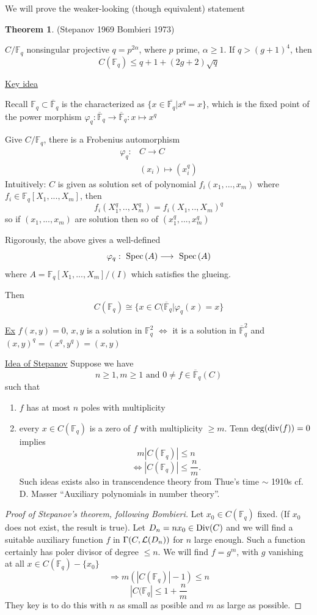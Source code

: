 \documentclass[11pt]{article}
\theoremstyle{definition}
\newtheorem{thm}{Theorem}[section]
\newcommand{\spec}{\text{ Spec}\,}
\newcommand{\bbf}{\mathbb F}
\newcommand{\call}{{\cal L}}
\renewcommand{\div}{\textnormal{div}}
\newcommand{\Div}{\textnormal{Div}}
\newcommand{\Lrta}{\Longrightarrow}
\newcommand{\lrta}{\longrightarrow}
\newcommand{\Llrta}{\Longleftrightarrow}
\begin{document}
We will prove the weaker-looking (though equivalent) statement 
\begin{thm}
(Stepanov 1969 Bombieri 1973)

$C/\bbf_q$ nonsingular projective $q=p^{2\alpha}$, where $p$ prime, $\alpha\geq 1$. If $q> (g+1)^4$, then 
$$
C(\bbf_q)\leq q+1+(2g+2)\sqrt{q}
$$
\end{thm}

\underline{Key idea}

Recall $\bbf_q\subset \overline{\bbf}_q$ is the characterized as $\{x\in \overline{\bbf_q}|x^q=x\}$, which is the fixed point of the power morphism $\varphi_q:\overline{\bbf}_q\lrta\overline{\bbf}_q:x\longmapsto x^q$

Give $C/\bbf_q$, there is a Frobenius automorphism
$$
\begin{aligned}
\varphi_q:&C\lrta C\\
& (x_i)\longmapsto (x_i^q)
\end{aligned}
$$
Intuitively: $C$ is given as solution set of polynomial $f_i(x_1,...,x_m)$ where $f_i\in\bbf_q[X_1,...,X_m]$, then
$$
f_i(X_1^q,..,X_m^q)=f_i(X_1,..,X_m)^q
$$
so if $(x_1,...,x_m)$ are solution then so of $(x_1^q,...,x_m^q)$


Rigorously, the above gives a well-defined 
$$
\varphi_q:\spec(A)\lrta \spec (A)\\
$$
where $A=\bbf_q[X_1,...,X_m]/(I)$ which satisfies the glueing.

Then
$$
C(\bbf_q)\cong \{x\in C(\overline{\bbf}_q|\varphi_q(x)=x\}
$$

\underline{Ex}
$f(x,y)=0$, $x,y$ is a solution in $\bbf_q^2$ $\Llrta $ it is a solution in $\overline{\bbf}_q^2$ and $(x,y)^q=(x^q,y^q)=(x,y)$

\underline{Idea of Stepanov}
Suppose we have 
$$
n\geq 1, m\geq 1 \text{ and } 0\neq f\in \overline{\bbf}_q(C)
$$
such that 
\begin{enumerate}
\item $f$ has at most $n$ poles with multiplicity
\item every $x\in C(\bbf_q)$ is a zero of $f$ with multiplicity $\geq m$. Tenn $\deg(\div(f))=0$ implies 
$$
m|C(\bbf_q)|\leq n
$$
$$
\Llrta |C(\bbf_q)|\leq \frac{n}{m}.
$$
Such ideas exists also in transcendence theory from Thue's time $\sim$ 1910s cf. D. Masser ``Auxiliary polynomials in number theory''.
\end{enumerate}
\begin{proof}[Proof of Stepanov's theorem, following Bombieri]
Let $x_0\in C(\bbf_q)$ fixed. (If $x_0$ does not exist, the result is true).
Let $D_n=nx_0\in \Div(C)$ and we will find  a suitable auxiliary function $f$ in $\Gamma(C,\call(D_n))$ for $n$ large enough. Such  a function certainly has poler divisor of degree $\leq n$. We will find $f=g^m$, with $g$ vanishing at all $x\in C(\bbf_q)-\{x_0\}$
$$
\Lrta m(|C(\bbf_q)|-1)\leq n
$$
$$
|C(\bbf_q|\leq 1+\frac{n}{m}
$$
They key is to do this with $n$ as small as posible and $m$ as large as possible.
\end{proof}
\end{document}
